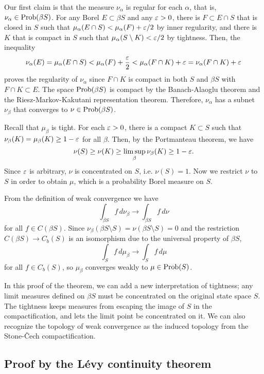 \documentclass[a4paper]{article}
\begin{document}
\begin{pf}
Our first claim is that the measure $\nu_\alpha$ is regular for each $\alpha$, that is, $\nu_\alpha\in\operatorname{Prob}(\beta S)$.
For any Borel $E\subset\beta S$ and any $\varepsilon>0$, there is $F\subset E\cap S$ that is closed in $S$ such that $\mu_\alpha(E\cap S)<\mu_\alpha(F)+\varepsilon/2$ by inner regularity, and there is $K$ that is compact in $S$ such that $\mu_\alpha(S\setminus K)<\varepsilon/2$ by tightness.
Then, the inequality
\[\nu_\alpha(E)=\mu_\alpha(E\cap S)<\mu_\alpha(F)+\frac{\varepsilon}2<\mu_\alpha(F\cap K)+\varepsilon=\nu_\alpha(F\cap K)+\varepsilon\]
proves the regularity of $\nu_\alpha$ since $F\cap K$ is compact in both $S$ and $\beta S$ with $F\cap K\subset E$.
The space $\operatorname{Prob}(\beta S)$ is compact by the Banach-Alaoglu theorem and the Riesz-Markov-Kakutani representation theorem.
Therefore, $\nu_\alpha$ has a subnet $\nu_\beta$ that converges to $\nu\in\operatorname{Prob}(\beta S)$.

Recall that $\mu_\beta$ is tight.
For each $\varepsilon>0$, there is a compact $K\subset S$ such that $\nu_\beta(K)=\mu_\beta(K)\ge1-\varepsilon$ for all $\beta$.
Then, by the Portmanteau theorem, we have
\[\nu(S)\ge\nu(K)\ge\limsup_\beta\nu_\beta(K)\ge1-\varepsilon.\]
Since $\varepsilon$ is arbitrary, $\nu$ is concentrated on $S$, i.e. $\nu(S)=1$.
Now we restrict $\nu$ to $S$ in order to obtain $\mu$, which is a probability Borel measure on $S$.

From the definition of weak convergence we have
\[\int_{\beta S}f\,d\nu_\beta\to\int_{\beta S}f\,d\nu\]
for all $f\in C(\beta S)$.
Since $\nu_\beta(\beta S\setminus S)=\nu(\beta S\setminus S)=0$ and the restriction $C(\beta S)\to C_b(S)$ is an isomorphism due to the universal property of $\beta S$,
\[\int_Sf\,d\mu_\beta\to\int_Sf\,d\mu\]
for all $f\in C_b(S)$, so $\mu_\beta$ converges weakly to $\mu\in\operatorname{Prob}(S)$.
\end{pf}

In this proof of the theorem, we can add a new interpretation of tightness; any limit measures defined on $\beta S$ must be concentrated on the original state space $S$.
The tightness keeps measures from escaping the image of $S$ in the compactification, and lets the limit point be concentrated on it.
We can also recognize the topology of weak convergence as the induced topology from the Stone-\v Cech compactification.



\subsection{Proof by the L\'evy continuity theorem}
\end{document}
